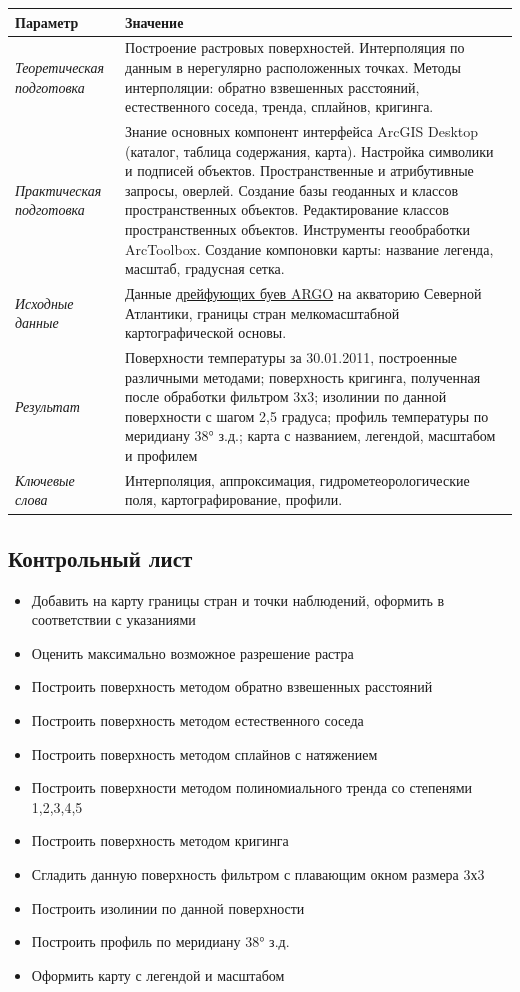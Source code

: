 \documentclass[12pt,]{book}
\providecommand{\tightlist}{%
  \setlength{\itemsep}{0pt}\setlength{\parskip}{0pt}}
\begin{document}
\begin{longtable}[]{@{}ll@{}}
\toprule
Параметр & Значение\tabularnewline
\midrule
\endhead
\emph{Теоретическая подготовка} & Построение растровых поверхностей. Интерполяция по данным в нерегулярно расположенных точках. Методы интерполяции: обратно взвешенных расстояний, естественного соседа, тренда, сплайнов, кригинга.\tabularnewline
\emph{Практическая подготовка} & Знание основных компонент интерфейса ArcGIS Desktop (каталог, таблица содержания, карта). Настройка символики и подписей объектов. Пространственные и атрибутивные запросы, оверлей. Создание базы геоданных и классов пространственных объектов. Редактирование классов пространственных объектов. Инструменты геообработки ArcToolbox. Создание компоновки карты: название легенда, масштаб, градусная сетка.\tabularnewline
\emph{Исходные данные} & Данные \href{http://www.argo.ucsd.edu}{дрейфующих буев ARGO} на акваторию Северной Атлантики, границы стран мелкомасштабной картографической основы.\tabularnewline
\emph{Результат} & Поверхности температуры за 30.01.2011, построенные различными методами; поверхность кригинга, полученная после обработки фильтром 3х3; изолинии по данной поверхности с шагом 2,5 градуса; профиль температуры по меридиану 38° з.д.; карта с названием, легендой, масштабом и профилем\tabularnewline
\emph{Ключевые слова} & Интерполяция, аппроксимация, гидрометеорологические поля, картографирование, профили.\tabularnewline
\bottomrule
\end{longtable}

\hypertarget{interpolation-control}{%
\subsection{Контрольный лист}\label{interpolation-control}}

\begin{itemize}
\tightlist
\item
  Добавить на карту границы стран и точки наблюдений, оформить в соответствии с указаниями
\item
  Оценить максимально возможное разрешение растра
\item
  Построить поверхность методом обратно взвешенных расстояний
\item
  Построить поверхность методом естественного соседа
\item
  Построить поверхность методом сплайнов с натяжением
\item
  Построить поверхности методом полиномиального тренда со степенями 1,2,3,4,5
\item
  Построить поверхность методом кригинга
\item
  Сгладить данную поверхность фильтром с плавающим окном размера 3х3
\item
  Построить изолинии по данной поверхности
\item
  Построить профиль по меридиану 38° з.д.
\item
  Оформить карту с легендой и масштабом
\end{itemize}
\end{document}
